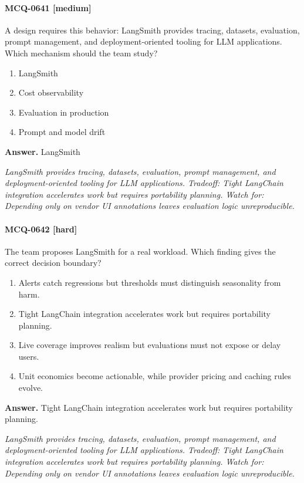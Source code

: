 \paragraph{MCQ-0641 [medium]} A design requires this behavior: LangSmith provides tracing, datasets, evaluation, prompt management, and deployment-oriented tooling for LLM applications. Which mechanism should the team study?
\begin{enumerate}[label=\Alph*.]
\item LangSmith
\item Cost observability
\item Evaluation in production
\item Prompt and model drift
\end{enumerate}
\noindent\textbf{Answer.} LangSmith
\par\textit{LangSmith provides tracing, datasets, evaluation, prompt management, and deployment-oriented tooling for LLM applications. Tradeoff: Tight LangChain integration accelerates work but requires portability planning. Watch for: Depending only on vendor UI annotations leaves evaluation logic unreproducible.}
\paragraph{MCQ-0642 [hard]} The team proposes LangSmith for a real workload. Which finding gives the correct decision boundary?
\begin{enumerate}[label=\Alph*.]
\item Alerts catch regressions but thresholds must distinguish seasonality from harm.
\item Tight LangChain integration accelerates work but requires portability planning.
\item Live coverage improves realism but evaluations must not expose or delay users.
\item Unit economics become actionable, while provider pricing and caching rules evolve.
\end{enumerate}
\noindent\textbf{Answer.} Tight LangChain integration accelerates work but requires portability planning.
\par\textit{LangSmith provides tracing, datasets, evaluation, prompt management, and deployment-oriented tooling for LLM applications. Tradeoff: Tight LangChain integration accelerates work but requires portability planning. Watch for: Depending only on vendor UI annotations leaves evaluation logic unreproducible.}
